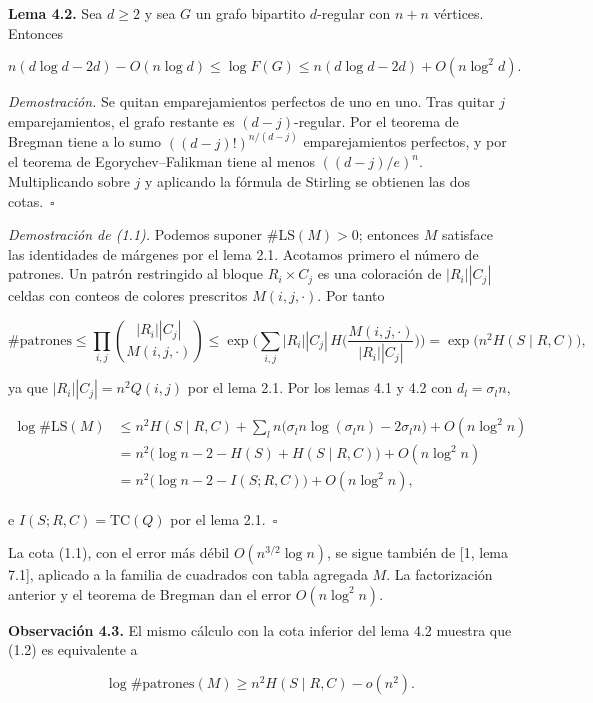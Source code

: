 \documentclass[spanish,11pt,a4paper]{article}
\begin{document}
\textbf{Lema 4.2.} Sea \(d\ge2\) y sea \(G\) un grafo bipartito \(d\)-regular con \(n+n\) vértices. Entonces

\nopagebreak[4]
\[n(d\log d-2d)-O(n\log d)\le\log F(G)\le n(d\log d-2d)+O(n\log^2 d).\]

\emph{Demostración.} Se quitan emparejamientos perfectos de uno en uno. Tras quitar \(j\) emparejamientos, el grafo restante es \((d-j)\)-regular. Por el teorema de Bregman tiene a lo sumo \(((d-j)!)^{n/(d-j)}\) emparejamientos perfectos, y por el teorema de Egorychev--Falikman tiene al menos \(((d-j)/e)^n\). Multiplicando sobre \(j\) y aplicando la fórmula de Stirling se obtienen las dos cotas.~\(\square\)

\emph{Demostración de (1.1).} Podemos suponer \(\#\mathrm{LS}(M)>0\); entonces \(M\) satisface las identidades de márgenes por el lema 2.1. Acotamos primero el número de patrones. Un patrón restringido al bloque \(R_i\times C_j\) es una coloración de \(|R_i||C_j|\) celdas con conteos de colores prescritos \(M(i,j,\cdot)\). Por tanto

\nopagebreak[4]
\[\#\text{patrones}\le\prod_{i,j}\binom{|R_i||C_j|}{M(i,j,\cdot)}\le\exp\Big(\sum_{i,j}|R_i||C_j|\,H\Big(\frac{M(i,j,\cdot)}{|R_i||C_j|}\Big)\Big)=\exp\big(n^2H(S\mid R,C)\big),\]

ya que \(|R_i||C_j|=n^2Q(i,j)\) por el lema 2.1. Por los lemas 4.1 y 4.2 con \(d_l=\sigma_l n\),

\nopagebreak[4]
\[\begin{aligned}
\log\#\mathrm{LS}(M)&\le n^2H(S\mid R,C)+\sum_l n\big(\sigma_l n\log(\sigma_l n)-2\sigma_l n\big)+O(n\log^2 n)\\
&=n^2\big(\log n-2-H(S)+H(S\mid R,C)\big)+O(n\log^2 n)\\
&=n^2\big(\log n-2-I(S;R,C)\big)+O(n\log^2 n),
\end{aligned}\]

e \(I(S;R,C)=\mathrm{TC}(Q)\) por el lema 2.1.~\(\square\)

La cota (1.1), con el error más débil \(O(n^{3/2}\log n)\), se sigue también de {[}1, lema 7.1{]}, aplicado a la familia de cuadrados con tabla agregada \(M\). La factorización anterior y el teorema de Bregman dan el error \(O(n\log^2 n)\).

\textbf{Observación 4.3.} El mismo cálculo con la cota inferior del lema 4.2 muestra que (1.2) es equivalente a

\nopagebreak[4]
\[\log\#\text{patrones}(M)\ge n^2H(S\mid R,C)-o(n^2).\tag{4.1}\]
\end{document}
